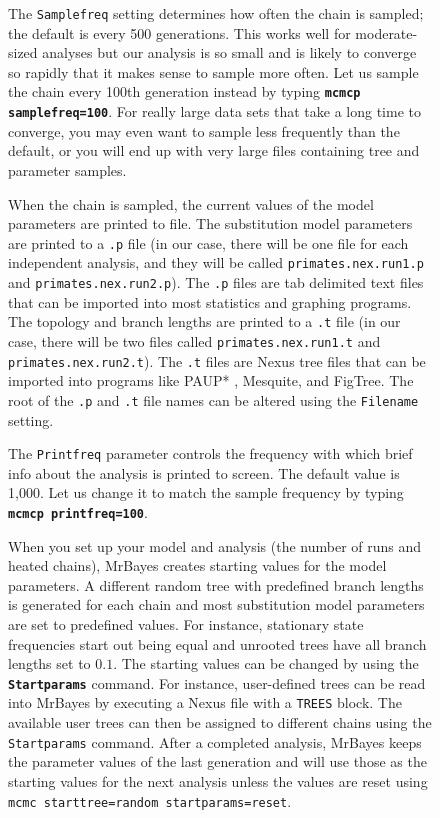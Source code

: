 \documentclass[12pt]{book}
\newcommand{\ttt}[1]{\texttt{#1}}
\newcommand{\tb}[1]{\ttt{\textbf{#1}}}
\begin{document}
\begin{figure}[h]
The \ttt{Samplefreq} setting determines how often the chain is sampled; the default is every 500
generations. This works well for moderate-sized analyses but our analysis is so small and is likely
to converge so rapidly that it makes sense to sample more often. Let us sample the chain every
100th generation instead by typing \tb{mcmcp samplefreq=100}. For really large data sets that take
a long time to converge, you may even want to sample less frequently than the default, or you will
end up with very large files containing tree and parameter samples.

When the chain is sampled, the current values of the model parameters are printed to file. The
substitution model parameters are printed to a \ttt{.p} file (in our case, there will be one file
for each independent analysis, and they will be called \ttt{primates.nex.run1.p} and
\ttt{primates.nex.run2.p}). The \ttt{.p} files are tab delimited text files that can be imported
into most statistics and graphing programs. The topology and branch lengths are printed to a
\ttt{.t} file (in our case, there will be two files called \ttt{primates.nex.run1.t} and
\ttt{primates.nex.run2.t}). The \ttt{.t} files are Nexus tree files that can be imported into
programs like PAUP* \citep{swofford98}, Mesquite, and FigTree. The root of the \ttt{.p} and
\ttt{.t} file names can be altered using the \ttt{Filename} setting.

The \ttt{Printfreq} parameter controls the frequency with which brief info about the analysis is
printed to screen. The default value is 1,000. Let us change it to match the sample frequency by
typing \tb{mcmcp printfreq=100}.

When you set up your model and analysis (the number of runs and heated chains), MrBayes creates
starting values for the model parameters. A different random tree with predefined branch lengths is
generated for each chain and most substitution model parameters are set to predefined values. For
instance, stationary state frequencies start out being equal and unrooted trees have all branch
lengths set to $0.1$. The starting values can be changed by using the \tb{Startparams} command.
For instance, user-defined trees can be read into MrBayes by executing a Nexus file with a
\ttt{TREES} block. The available user trees can then be assigned to different chains using the
\ttt{Startparams} command. After a completed analysis, MrBayes keeps the parameter values of the
last generation and will use those as the starting values for the next analysis unless the values
are reset using \ttt{mcmc starttree=random startparams=reset}.


\end{figure}
\end{document}
